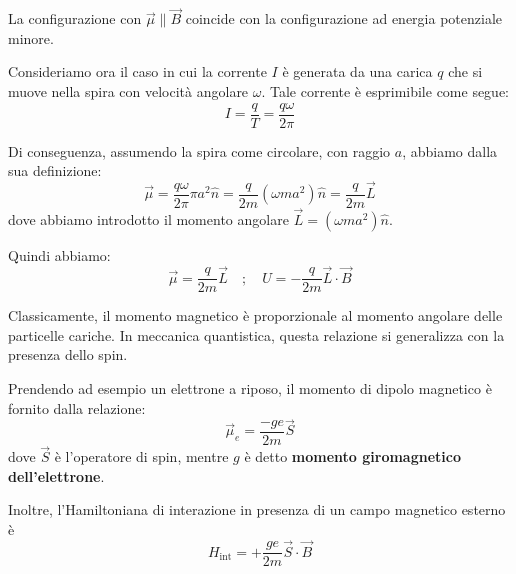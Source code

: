 \documentclass[../main.tex]{subfiles}
\begin{document}
La configurazione con \(\Vec{\mu}\parallel\Vec{B}\) coincide con la configurazione ad energia potenziale minore.

Consideriamo ora il caso in cui la corrente $I$ è generata da una carica $q$ che si muove nella spira con velocità angolare $\omega$. Tale corrente è esprimibile come segue:
\[
I = \frac{q}{T} = \frac{q\omega}{2\pi}
\]

Di conseguenza, assumendo la spira come circolare, con raggio $a$, abbiamo dalla sua definizione:
\[
\Vec\mu = \frac{q\omega}{2\pi}\pi a^2 \hat{n} = \frac{q}{2m} (\omega m a^2) \hat{n} = \frac{q}{2m}\Vec{L}
\]
dove abbiamo introdotto il momento angolare \(\Vec{L}=(\omega m a^2) \hat{n}\).

Quindi abbiamo:
\[
\boxed{\Vec\mu = \frac{q}{2m}\Vec{L} \quad ; \quad U = -\frac{q}{2m}\Vec{L}\cdot\Vec{B}}
\]

Classicamente, il momento magnetico è proporzionale al momento angolare delle particelle cariche. In meccanica quantistica, questa relazione si generalizza con la presenza dello spin.

Prendendo ad esempio un elettrone a riposo, il momento di dipolo magnetico è fornito dalla relazione:
\begin{equation}
    \boxed{\Vec\mu_e = \frac{-ge}{2m}\Vec{S}}
    \label{eq:electrone_dipole_moment}
\end{equation}
dove $\Vec{S}$ è l'operatore di spin, mentre $g$ è detto \textbf{momento giromagnetico dell'elettrone}.

Inoltre, l'Hamiltoniana di interazione in presenza di un campo magnetico esterno è
\begin{equation}
    \boxed{H_\text{int} = +\frac{ge}{2m}\Vec{S}\cdot\Vec{B}}
    \label{eq:magn_inter_hamiltonian}
\end{equation}
\end{document}
